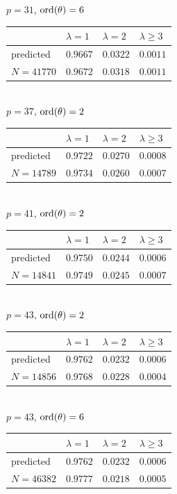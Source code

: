 \documentclass[pdflatex,sn-mathphys-num]{sn-jnl}%
\theoremstyle{plain}
\theoremstyle{definition}
\theoremstyle{remark}
\numberwithin{equation}{section}
\newcommand{\ord}{\text{\rm ord}}
\begin{document}
\noindent $p=31$, $\ord(\theta)=6$\\
\begin{tabular}{|l|l|l|l|} \hline
 & $\lambda=1$ & $\lambda=2$ & $\lambda \geq 3$ \\ \hline
predicted &  $0.9667$ & $0.0322$ & $0.0011$ \\ \hline
 $N=41770$ & $0.9672$ & $0.0318$ & $0.0011$\\ \hline
\end{tabular}\\

\noindent $p=37$, $\ord(\theta)=2$\\
\begin{tabular}{|l|l|l|l|} \hline
 & $\lambda=1$ & $\lambda=2$ & $\lambda \geq 3$ \\ \hline
predicted & $0.9722$ & $0.0270$ & $0.0008$   \\ \hline
$N=14789$ &  $0.9734$ & $0.0260$ & $0.0007$  \\ \hline
\end{tabular}\\

\noindent $p=41$, $\ord(\theta)=2$\\
\begin{tabular}{|l|l|l|l|} \hline
 & $\lambda=1$ & $\lambda=2$ & $\lambda \geq 3$ \\ \hline
predicted &  $0.9750$ & $0.0244$ & $0.0006$ \\ \hline
$N=14841$ & $0.9749$ & $0.0245$ & $0.0007$  \\ \hline
\end{tabular}\\

\noindent $p=43$, $\ord(\theta)=2$\\
\begin{tabular}{|l|l|l|l|} \hline
 & $\lambda=1$ & $\lambda=2$ & $\lambda \geq 3$ \\ \hline
predicted & $0.9762$ & $0.0232$ & $0.0006$ \\ \hline
$N=14856$ & $0.9768$ & $0.0228$ & $0.0004$ \\ \hline
\end{tabular}\\

\noindent $p=43$, $\ord(\theta)=6$\\
\begin{tabular}{|l|l|l|l|} \hline
 & $\lambda=1$ & $\lambda=2$ & $\lambda \geq 3$ \\ \hline
predicted & $0.9762$ & $0.0232$ & $0.0006$ \\ \hline
$N=46382$ & $0.9777$ & $0.0218$ & $0.0005$ \\ \hline
\end{tabular}\\
\end{document}
